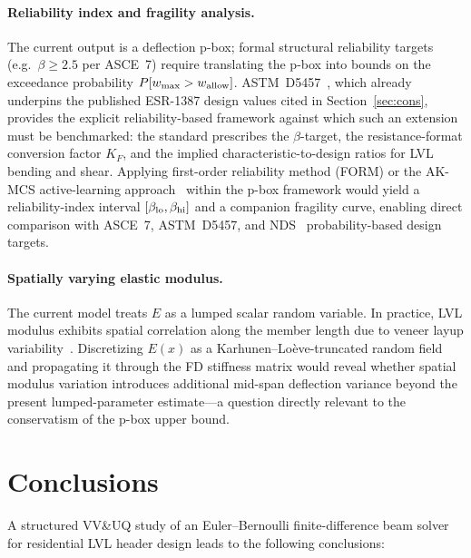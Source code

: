 \documentclass[10pt,twocolumn]{article}
\begin{document}
\paragraph{Reliability index and fragility analysis.}
The current output is a deflection p-box; formal structural reliability
targets (e.g.\ $\beta \ge 2.5$ per ASCE~7) require translating the
p-box into bounds on the exceedance probability
$P[w_{\rm max} > w_{\rm allow}]$.
ASTM~D5457~\cite{astmD5457}, which already underpins the published
ESR-1387 design values cited in Section~\ref{sec:cons}, provides the
explicit reliability-based framework against which such an extension
must be benchmarked: the standard prescribes the $\beta$-target,
the resistance-format conversion factor $K_F$, and the implied
characteristic-to-design ratios for LVL bending and shear.
Applying first-order reliability method (FORM) or the AK-MCS
active-learning approach~\cite{du2023} within the p-box framework
would yield a reliability-index interval $[\beta_{\rm lo},\beta_{\rm hi}]$
and a companion fragility curve, enabling direct comparison with
ASCE~7, ASTM~D5457, and NDS~\cite{nds2018} probability-based design
targets.

\paragraph{Spatially varying elastic modulus.}
The current model treats $E$ as a lumped scalar random variable.
In practice, LVL modulus exhibits spatial correlation along the
member length due to veneer layup variability~\cite{leichsenring2018}.
Discretizing $E(x)$ as a Karhu\-nen--Lo\`eve-truncated random field
and propagating it through the FD stiffness matrix would reveal whether
spatial modulus variation introduces additional mid-span deflection
variance beyond the present lumped-parameter estimate---a question
directly relevant to the conservatism of the p-box upper bound.

\section{Conclusions}
\label{sec:conc}

A structured VV\&UQ study of an Euler--Bernoulli finite-difference
beam solver for residential LVL header design leads to the following
conclusions:
\end{document}
